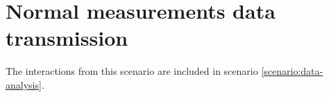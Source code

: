\section{Normal measurements data transmission}
\label{scenario:measurements-transmission}

\npar The interactions from this scenario are included in scenario
\ref{scenario:data-analysis}.
